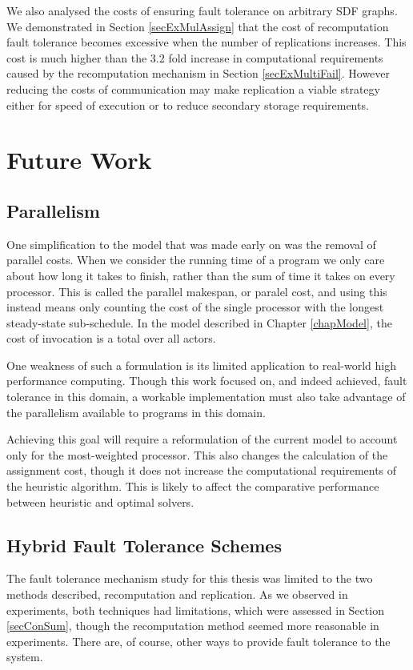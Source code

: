 We also analysed the costs of ensuring fault tolerance on arbitrary SDF graphs.
We demonstrated in Section \ref{secExMulAssign} that the cost of recomputation fault tolerance becomes excessive when the number of replications increases.
This cost is much higher than the 3.2 fold increase in computational requirements caused by the recomputation mechanism in Section \ref{secExMultiFail}.
However reducing the costs of communication may make replication a viable strategy either for speed of execution or to reduce secondary storage requirements.

\section{Future Work}
\label{secConFut}

\subsection{Parallelism}

One simplification to the model that was made early on was the removal of parallel costs.
When we consider the running time of a program we only care about how long it takes to finish, rather than the sum of time it takes on every processor.
This is called the parallel makespan, or paralel cost, and using this instead means only counting the cost of the single processor with the longest steady-state sub-schedule.
In the model described in Chapter \ref{chapModel}, the cost of invocation is a total over all actors.

One weakness of such a formulation is its limited application to real-world high performance computing.
Though this work focused on, and indeed achieved, fault tolerance in this domain, a workable implementation must also take advantage of the parallelism available to programs in this domain.

Achieving this goal will require a reformulation of the current model to account only for the most-weighted processor.
This also changes the calculation of the assignment cost, though it does not increase the computational requirements of the heuristic algorithm.
This is likely to affect the comparative performance between heuristic and optimal solvers.

\subsection{Hybrid Fault Tolerance Schemes}

The fault tolerance mechanism study for this thesis was limited to the two methods described, recomputation and replication.
As we observed in experiments, both techniques had limitations, which were assessed in Section \ref{secConSum}, though the recomputation method seemed more reasonable in experiments.
There are, of course, other ways to provide fault tolerance to the system.

